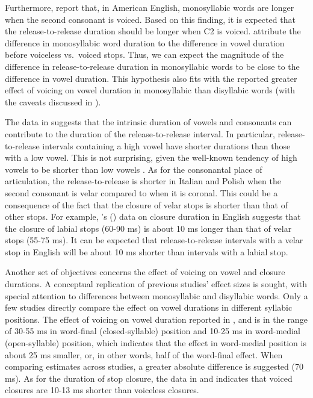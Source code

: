 \documentclass[12pt,a4paper,]{article}
\begin{document}
Furthermore, \citet{jacewicz2009} report that, in American English,
monosyllabic words are longer when the second consonant is voiced. Based
on this finding, it is expected that the release-to-release duration
should be longer when C2 is voiced. \citet{jacewicz2009} attribute the
difference in monosyllabic word duration to the difference in vowel
duration before voiceless vs.~voiced stops. Thus, we can expect the
magnitude of the difference in release-to-release duration in
monosyllabic words to be close to the difference in vowel duration. This
hypothesis also fits with the reported greater effect of voicing on
vowel duration in monosyllabic than disyllabic words (with the caveats
discussed in ).

The data in \citet{coretta2019k} suggests that the intrinsic duration of
vowels and consonants can contribute to the duration of the
release-to-release interval. In particular, release-to-release intervals
containing a high vowel have shorter durations than those with a low
vowel. This is not surprising, given the well-known tendency of high
vowels to be shorter than low vowels
\citep{hertrich1997, esposito2002, mortensen2013, toivonen2015, kawahara2017}.
As for the consonantal place of articulation, the release-to-release is
shorter in Italian and Polish when the second consonant is velar
compared to when it is coronal. This could be a consequence of the fact
that the closure of velar stops is shorter than that of other stops. For
example, \citeauthor{sharf1962}'s (\citeyear{sharf1962}) data on closure
duration in English suggests that the closure of labial stops (60-90 ms)
is about 10 ms longer than that of velar stops (55-75 ms). It can be
expected that release-to-release intervals with a velar stop in English
will be about 10 ms shorter than intervals with a labial stop.

Another set of objectives concerns the effect of voicing on vowel and
closure durations. A conceptual replication of previous studies' effect
sizes is sought, with special attention to differences between
monosyllabic and disyllabic words. Only a few studies directly compare
the effect on vowel durations in different syllabic positions. The
effect of voicing on vowel duration reported in \citet{sharf1962},
\citet{klatt1973} and \citet{port1981} is in the range of 30-55 ms in
word-final (closed-syllable) position and 10-25 ms in word-medial
(open-syllable) position, which indicates that the effect in word-medial
position is about 25 ms smaller, or, in other words, half of the
word-final effect. When comparing estimates across studies, a greater
absolute difference is suggested (70 ms). As for the duration of stop
closure, the data in \citet{sharf1962} and \citet{luce1985} indicates
that voiced closures are 10-13 ms shorter than voiceless closures.
\end{document}
